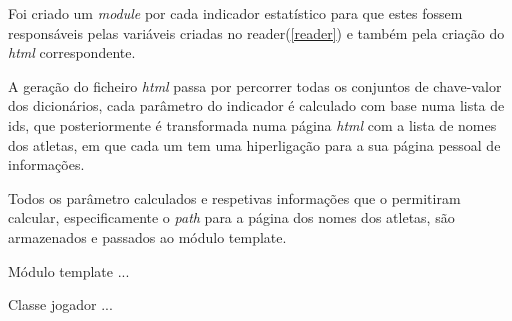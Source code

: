 Foi criado um \textit{module} por cada indicador estatístico para que estes fossem
responsáveis pelas variáveis criadas no reader(\ref{reader}) e também pela criação
do \textit{html} correspondente.

A geração do ficheiro \textit{html} passa por percorrer todas os conjuntos de chave-valor
dos dicionários, cada parâmetro do indicador é calculado com base numa lista de ids, que posteriormente é  
transformada numa página \textit{html} com a lista de nomes dos atletas, em que cada um tem uma hiperligação 
para a sua página pessoal de informações. 

Todos os parâmetro calculados e respetivas informações que o permitiram calcular, especificamente o 
\textit{path} para a página dos nomes dos atletas, são armazenados e passados ao módulo template.

Módulo template ... 

Classe jogador ...



